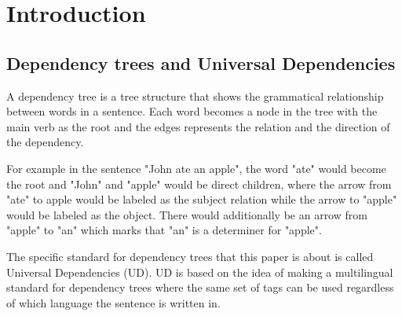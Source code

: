 \documentclass{article}
\begin{document}



\section{Introduction}

\subsection{Dependency trees and Universal Dependencies}
A dependency tree is a tree structure that shows the grammatical relationship between words in a sentence. Each word becomes a node in the tree with the main verb as the root and the edges represents the relation and the direction of the dependency.

For example in the sentence "John ate an apple", the word "ate" would become the root and "John" and "apple" would be direct children, where the arrow from "ate" to apple would be labeled as the subject relation while the arrow to "apple" would be labeled as the object. There would additionally be an arrow from "apple" to "an" which marks that "an" is a determiner for "apple".



The specific standard for dependency trees that this paper is about is called Universal Dependencies (UD). UD is based on the idea of making a multilingual standard for dependency trees where the same set of tags can be used regardless of which language the sentence is written in.
\end{document}
